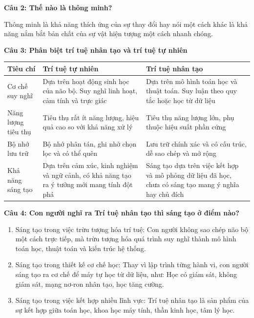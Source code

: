 \textbf{Câu 2: Thế nào là thông minh?}

Thông minh là khả năng thích ứng của sự thay đổi hay nói một cách khác là khả năng nắm bắt bản chất của sự vật hiện tượng một cách nhanh chóng.

\textbf{Câu 3: Phân biệt trí tuệ nhân tạo và trí tuệ tự nhiên}

\begin{table}[H]
	\centering
	\begin{tabular}{|p{2cm}|p{5cm}|p{5cm}|}
		\hline
		Tiêu chí & Trí tuệ tự nhiên & Trí tuệ nhân tạo \\ \hline
		Cơ chế suy nghĩ & Dựa trên hoạt động sinh học của não bộ. Suy nghĩ linh hoạt, cảm tính và trực giác & Dựa trên mô hình toán học và thuật toán. Suy luận theo quy tắc hoặc học từ dữ liệu \\ \hline
		Năng lượng tiêu thụ & Tiêu thụ rất ít năng lượng, hiệu quả cao so với khả năng xử lý & Tiêu thụ năng lượng lớn, phụ thuộc hiệu suất phần cứng \\ \hline
		Bộ nhớ lưu trữ & Bộ nhớ phân tán, ghi nhớ chọn lọc và có thể quên & Lưu trữ chính xác và có cấu trúc, dễ sao chép và mở rộng \\ \hline
		Khả năng sáng tạo & Dựa trên cảm xúc, kinh nghiệm và ngữ cảnh, có khả năng tạo ra ý tưởng mới mang tính đột phá & Sáng tạo dựa trên việc kết hợp và mô phỏng dữ liệu đã học, chưa có sáng tạo mang ý nghĩa hay chủ đích \\ \hline
	\end{tabular}
\end{table}

\textbf{Câu 4: Con người nghĩ ra Trí tuệ nhân tạo thì sáng tạo ở điểm nào?}

\begin{enumerate}
	\item Sáng tạo trong việc trừu tượng hóa trí tuệ: Con người không sao chép não bộ một cách trực tiếp, mà trừu tượng hóa quá trình suy nghĩ thành mô hình toán học, thuật toán và kiến trúc hệ thống.
	
	\item Sáng tạo trong thiết kế cơ chế học: Thay vì lập trình từng hành vi, con người sáng tạo ra cơ chế để máy tự học từ dữ liệu, như: Học có giám sát, không giám sát, mạng nơ-ron nhân tạo, học tăng cường.
	
	\item Sáng tạo trong việc kết hợp nhiều lĩnh vực: Trí tuệ nhân tạo là sản phẩm của sự kết hợp giữa toán học, khoa học máy tính, thần kinh học, tâm lý học.
\end{enumerate}

